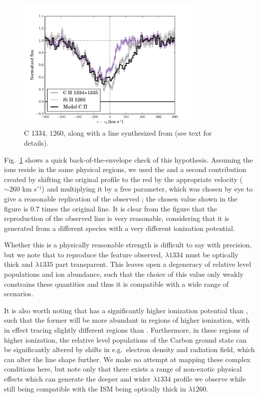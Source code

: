 \documentclass[twocolumn]{aastex61}
\begin{document}
\begin{figure}
\centering
\includegraphics[width=3.500in]{./CIIdoubletmodel.pdf}
\caption{C  1334,  1260, along with a 
line synthesized from  (see text for
details).}\label{fig:CII}
\end{figure}

Fig.~\ref{fig:CII} shows a quick back-of-the-envelope check of this
hypothesis. Assuming the ions reside in the same physical regions, we
used the  and a second contribution created by shifting the
original profile to the red by the appropriate velocity ($\sim 260$ km
s⁻¹) and multiplying it by a free parameter, which was chosen by eye to
give a reasonable replication of the observed ; the chosen
value shown in the figure is 0.7 times the original line. It is clear
from the figure that the reproduction of the observed  line is
very reasonable, considering that it is generated from a different
species with a very different ionization potential.

Whether this is a physically reasonable strength is difficult to say
with precision, but we note that to reproduce the feature observed,
$\lambda 1334$ must be optically thick and $\lambda 1335$ part
transparent. This leaves open a degeneracy of relative level populations
and ion abundance, such that the choice of this value only weakly
constrains these quantities and thus it is compatible with a wide range
of scenarios.

It is also worth noting that  has a significantly higher
ionization potential than , such that the former will be more
abundant in regions of higher ionization, with  in effect
tracing slightly different regions than . Furthermore, in
these regions of higher ionization, the relative level populations of
the Carbon ground state can be significantly altered by shifts in
e.g.~electron density and radiation field, which can alter the line
shape further. We make no attempt at mapping these complex conditions
here, but note only that there exists a range of non-exotic physical
effects which can generate the deeper and wider $\lambda 1334$ profile
we observe while still being compatible with the ISM being optically
thick in  $\lambda 1260$.
\end{document}
